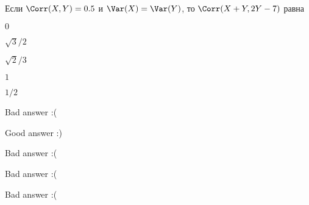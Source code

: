 
\begin{question}
Если \(\Corr(X, Y)= 0.5\) и \(\Var(X)=\Var(Y)\), то
\(\Corr(X + Y, 2Y - 7)\) равна
\begin{answerlist}
  \item \(0\)
  \item \(\sqrt{3}/2\)
  \item \(\sqrt{2}/3\)
  \item \(1\)
  \item \(1/2\)
\end{answerlist}
\end{question}

\begin{solution}
\begin{answerlist}
  \item Bad answer :(
  \item Good answer :)
  \item Bad answer :(
  \item Bad answer :(
  \item Bad answer :(
\end{answerlist}
\end{solution}

